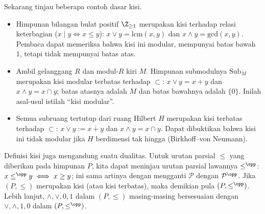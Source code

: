 Sekarang tinjau beberapa contoh dasar kisi.
\begin{itemize}
	\item Himpunan bilangan bulat positif $\Z_{\geq 1}$ merupakan kisi terhadap
	relasi keterbagian ($x \mid y \iff x \leq y$):
	$x \vee y=\mathrm{lcm}(x,y)$ dan $x \wedge y=\mathrm{gcd}(x,y)$. Pembaca
	dapat memeriksa bahwa kisi ini modular, mempunyai batas bawah $1$, tetapi
	tidak mempunyai batas atas.

	\item Ambil gelanggang $R$ dan modul-$R$ kiri $M$. Himpunan submodulnya
	$\mathrm{Sub}_M$ merupakan kisi modular terbatas terhadap $\subset$:
	$x \vee y=x+y$ dan $x \wedge y=x \cap y$; batas atasnya adalah $M$ dan batas
	bawahnya adalah $\{0\}$. Inilah asal-usul istilah ``kisi modular''.

	\item Semua subruang tertutup dari ruang Hilbert $H$ merupakan kisi terbatas
	terhadap $\subset$: $x \vee y:=\overline{x+y}$ dan $x \wedge y=x \cap y$.
	Dapat dibuktikan bahwa kisi ini tidak modular jika $H$ berdimensi tak hingga
	(Birkhoff--von Neumann).
\end{itemize}

\begin{catatan}\label{rem:lattice-duality}
	Definisi kisi juga mengandung suatu dualitas. Untuk urutan parsial
	$\leq$ yang diberikan pada himpunan $P$, kita dapat meninjau urutan parsial
	lawannya $\leq^{\opp}$: $x \leq^{\opp}y \iff x \geq y$; ini sama artinya
	dengan mengganti $\mathcal{P}$ dengan $\mathcal{P}^{\opp}$. Jika
	$(P,\leq)$ merupakan kisi (atau kisi terbatas), maka demikian pula
	$(P,\leq^{\opp})$. Lebih lanjut, $\wedge,\vee,0,1$ dalam $(P,\leq)$
	masing-masing bersesuaian dengan $\vee,\wedge,1,0$ dalam
	$(P,\leq^{\opp})$.
\end{catatan}

